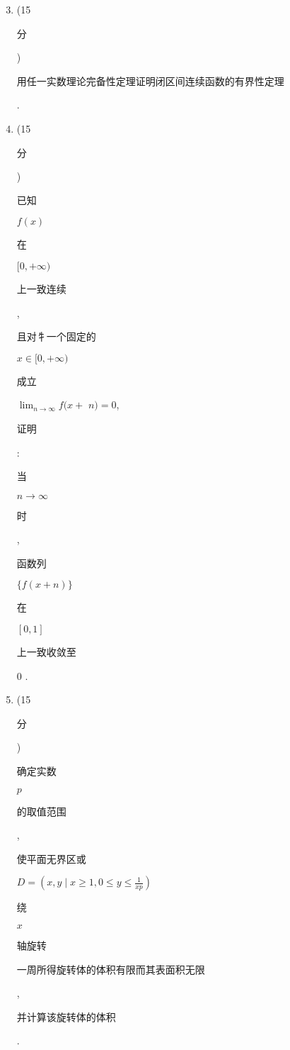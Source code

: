 \documentclass[10pt]{article}
\begin{document}
\begin{enumerate}
  \setcounter{enumi}{2}
  \item (15 \begin{CJK}{UTF8}{mj}分\end{CJK}) \begin{CJK}{UTF8}{mj}用任一实数理论完备性定理证明闭区间连续函数的有界性定理\end{CJK}.

  \item (15 \begin{CJK}{UTF8}{mj}分\end{CJK}) \begin{CJK}{UTF8}{mj}已知\end{CJK} $f(x)$ \begin{CJK}{UTF8}{mj}在\end{CJK} $[0,+\infty)$ \begin{CJK}{UTF8}{mj}上一致连续\end{CJK}, \begin{CJK}{UTF8}{mj}且对牜一个固定的\end{CJK} $x \in[0,+\infty)$ \begin{CJK}{UTF8}{mj}成立\end{CJK} $\lim _{n \rightarrow \infty} f(x+$ $n)=0$, \begin{CJK}{UTF8}{mj}证明\end{CJK}: \begin{CJK}{UTF8}{mj}当\end{CJK} $n \rightarrow \infty$ \begin{CJK}{UTF8}{mj}时\end{CJK}, \begin{CJK}{UTF8}{mj}函数列\end{CJK} $\{f(x+n)\}$ \begin{CJK}{UTF8}{mj}在\end{CJK} $[0,1]$ \begin{CJK}{UTF8}{mj}上一致收敛至\end{CJK} 0 .

  \item (15 \begin{CJK}{UTF8}{mj}分\end{CJK}) \begin{CJK}{UTF8}{mj}确定实数\end{CJK} $p$ \begin{CJK}{UTF8}{mj}的取值范围\end{CJK}, \begin{CJK}{UTF8}{mj}使平面无界区或\end{CJK} $D=\left(x, y \mid x \geq 1,0 \leq y \leq \frac{1}{x p}\right)$ \begin{CJK}{UTF8}{mj}绕\end{CJK} $x$ \begin{CJK}{UTF8}{mj}轴旋转\end{CJK} \begin{CJK}{UTF8}{mj}一周所得旋转体的体积有限而其表面积无限\end{CJK}, \begin{CJK}{UTF8}{mj}并计算该旋转体的体积\end{CJK}.


\end{enumerate}
\end{document}
